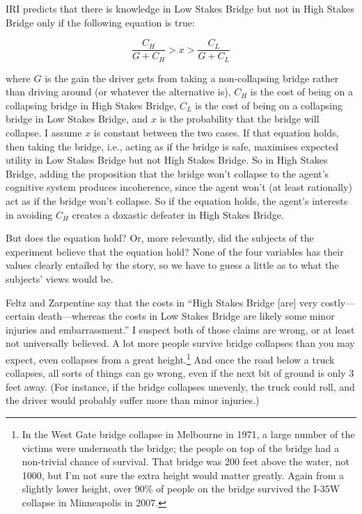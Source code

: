\documentclass[oneside]{book}
\begin{document}
IRI predicts that there is knowledge in Low Stakes Bridge but not in High Stakes Bridge only if the following equation is true:

\begin{equation*}
\frac{C_H}{G + C_H} > x > \frac{C_L}{G + C_L}
\end{equation*}

\noindent where $G$ is the gain the driver gets from taking a non-collapsing bridge rather than driving around (or whatever the alternative is), $C_H$ is the cost of being on a collapsing bridge in High Stakes Bridge, $C_L$ is the cost of being on a collapsing bridge in Low Stakes Bridge, and $x$ is the probability that the bridge will collapse. I assume $x$ is constant between the two cases. If that equation holds, then taking the bridge, i.e., acting as if the bridge is safe, maximises expected utility in Low Stakes Bridge but not High Stakes Bridge. So in High Stakes Bridge, adding the proposition that the bridge won't collapse to the agent's cognitive system produces incoherence, since the agent won't (at least rationally) act as if the bridge won't collapse. So if the equation holds, the agent's interests in avoiding $C_H$ creates a doxastic defeater in High Stakes Bridge.

But does the equation hold? Or, more relevantly, did the subjects of the experiment believe that the equation hold? None of the four variables has their values clearly entailed by the story, so we have to guess a little as to what the subjects' views would be. 

Feltz and Zarpentine say that the costs in ``High Stakes Bridge [are] very costly---certain death---whereas the costs in Low Stakes Bridge are likely some minor injuries and embarrassment.'' \cite[??]{FeltzZarpentine2010} I suspect both of those claims are wrong, or at least not universally believed. A lot more people survive bridge collapses than you may expect, even collapses from a great height.\footnote{In the West Gate bridge collapse in Melbourne in 1971, a large number of the victims were underneath the bridge; the people on top of the bridge had a non-trivial chance of survival. That bridge was 200 feet above the water, not 1000, but I'm not sure the extra height would matter greatly. Again from a slightly lower height, over 90\% of people on the bridge survived the I-35W collapse in Minneapolis in 2007.} And once the road below a truck collapses, all sorts of things can go wrong, even if the next bit of ground is only 3 feet away. (For instance, if the bridge collapses unevenly, the truck could roll, and the driver would probably suffer more than minor injuries.)
\end{document}
